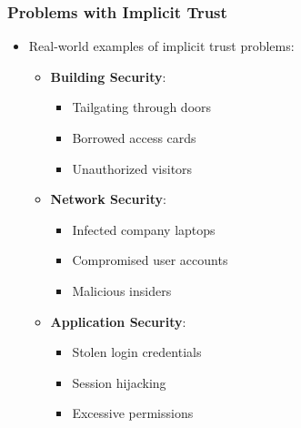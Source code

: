 \documentclass{beamer}
\begin{document}
\begin{frame}
    \frametitle{Problems with Implicit Trust}
    \begin{itemize}
        \item Real-world examples of implicit trust problems:
            \begin{itemize}
                \item \textbf{Building Security}:
                    \begin{itemize}
                        \item Tailgating through doors
                        \item Borrowed access cards
                        \item Unauthorized visitors
                    \end{itemize}
                \item \textbf{Network Security}:
                    \begin{itemize}
                        \item Infected company laptops
                        \item Compromised user accounts
                        \item Malicious insiders
                    \end{itemize}
                \item \textbf{Application Security}:
                    \begin{itemize}
                        \item Stolen login credentials
                        \item Session hijacking
                        \item Excessive permissions
                    \end{itemize}
            \end{itemize}
    \end{itemize}
\end{frame}
\end{document}
